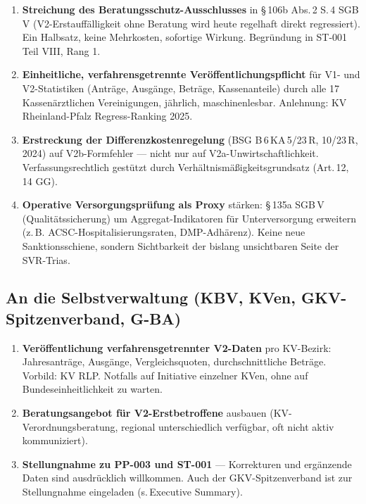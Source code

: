 \documentclass{umbruch-position}
\begin{document}
\begin{enumerate}[nosep,leftmargin=*]
  \item \textbf{Streichung des Beratungsschutz-Ausschlusses} in \S\,106b Abs.\,2 S.\,4 SGB\,V (V2-Erstauffälligkeit ohne Beratung wird heute regelhaft direkt regressiert). Ein Halbsatz, keine Mehrkosten, sofortige Wirkung. Begründung in ST-001 Teil VIII, Rang 1.
  \item \textbf{Einheitliche, verfahrensgetrennte Veröffentlichungspflicht} für V1- und V2-Statistiken (Anträge, Ausgänge, Beträge, Kassenanteile) durch alle 17 Kassenärztlichen Vereinigungen, jährlich, maschinenlesbar. Anlehnung: KV Rheinland-Pfalz Regress-Ranking 2025.
  \item \textbf{Erstreckung der Differenzkostenregelung} (BSG B\,6\,KA\,5/23\,R, 10/23\,R, 2024) auf V2b-Formfehler --- nicht nur auf V2a-Unwirtschaftlichkeit. Verfassungsrechtlich gestützt durch Verhältnismäßigkeitsgrundsatz (Art.\,12, 14 GG).
  \item \textbf{Operative Versorgungsprüfung als Proxy} stärken: \S\,135a SGB\,V (Qualitätssicherung) um Aggregat-Indikatoren für Unterversorgung erweitern (z.\,B. ACSC-Hospitalisierungsraten, DMP-Adhärenz). Keine neue Sanktionsschiene, sondern Sichtbarkeit der bislang unsichtbaren Seite der SVR-Trias.
\end{enumerate}

\subsection{An die Selbstverwaltung (KBV, KVen, GKV-Spitzenverband, G-BA)}

\begin{enumerate}[nosep,leftmargin=*]
  \item \textbf{Veröffentlichung verfahrensgetrennter V2-Daten} pro KV-Bezirk: Jahresanträge, Ausgänge, Vergleichsquoten, durchschnittliche Beträge. Vorbild: KV RLP. Notfalls auf Initiative einzelner KVen, ohne auf Bundeseinheitlichkeit zu warten.
  \item \textbf{Beratungsangebot für V2-Erstbetroffene} ausbauen (KV-Verordnungsberatung, regional unterschiedlich verfügbar, oft nicht aktiv kommuniziert).
  \item \textbf{Stellungnahme zu PP-003 und ST-001} --- Korrekturen und ergänzende Daten sind ausdrücklich willkommen. Auch der GKV-Spitzenverband ist zur Stellungnahme eingeladen (s.\,Executive Summary).
\end{enumerate}
\end{document}
